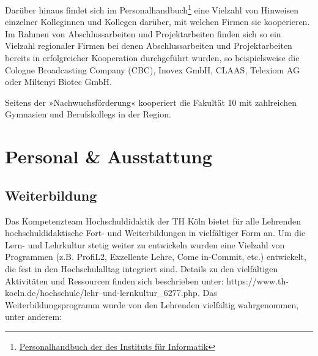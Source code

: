 Darüber hinaus findet sich im Personalhandbuch\footnote{\href{http://bit.ly/2mpcbWN}{Personalhandbuch
  der des Instituts für Informatik}} eine Vielzahl von Hinweisen
einzelner Kolleginnen und Kollegen darüber, mit welchen Firmen sie
kooperieren. Im Rahmen von Abschlussarbeiten und Projektarbeiten finden
sich so ein Vielzahl regionaler Firmen bei denen Abschlussarbeiten und
Projektarbeiten bereits in erfolgreicher Kooperation durchgeführt
wurden, so beispielsweise die Cologne Broadcasting Company (CBC), Inovex
GmbH, CLAAS, Telexiom AG oder Miltenyi Biotec GmbH.

Seitens der »Nachwuchsförderung« kooperiert die Fakultät 10 mit
zahlreichen Gymnasien und Berufskollegs in der Region.

\chapter{Personal \&
Ausstattung\label{/mi-2017/selbstbericht/0800-ausstattung/0000-ausstattung}}\label{personal-ausstattungpathlabelmi-2017selbstbericht0800-ausstattung0000-ausstattung}

\section{Weiterbildung\label{/mi-2017/selbstbericht/0800-ausstattung/0000-ausstattung}}\label{weiterbildungpathlabelmi-2017selbstbericht0800-ausstattung0000-ausstattung}

Das Kompetenzteam Hochschuldidaktik der TH Köln bietet für alle
Lehrenden hochschuldidaktische Fort- und Weiterbildungen in vielfältiger
Form an. Um die Lern- und Lehrkultur stetig weiter zu entwickeln wurden
eine Vielzahl von Programmen (z.B. ProfiL2, Exzellente Lehre, Come
in-Commit, etc.) entwickelt, die fest in den Hochschulalltag integriert
sind. Details zu den vielfältigen Aktivitäten und Ressourcen finden sich
beschrieben unter:
https://www.th-koeln.de/hochschule/lehr--und-lernkultur\_6277.php. Das
Weiterbildungsprogramm wurde von den Lehrenden vielfältig wahrgenommen,
unter anderem:


